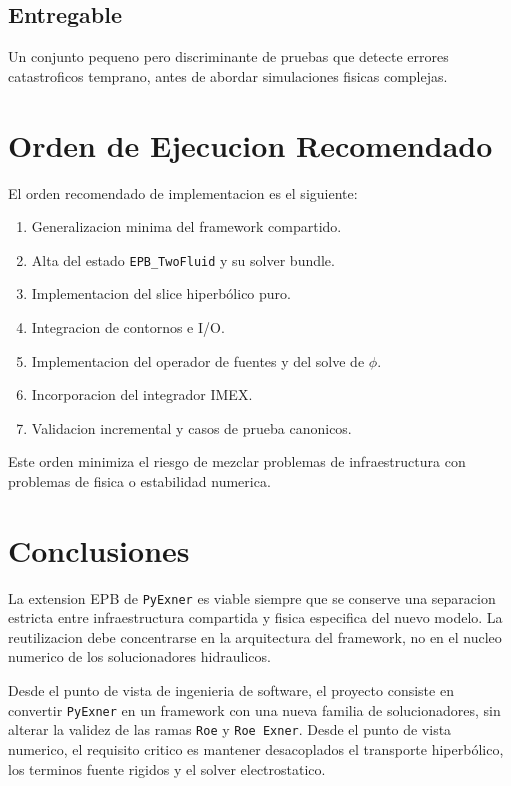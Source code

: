 \documentclass[11pt]{article}
\begin{document}
\subsection*{Entregable}

Un conjunto pequeno pero discriminante de pruebas que detecte errores catastroficos temprano, antes de abordar simulaciones fisicas complejas.

\section{Orden de Ejecucion Recomendado}

El orden recomendado de implementacion es el siguiente:

\begin{enumerate}[label=\arabic*.]
    \item Generalizacion minima del framework compartido.
    \item Alta del estado \texttt{EPB\_TwoFluid} y su solver bundle.
    \item Implementacion del slice hiperb\'olico puro.
    \item Integracion de contornos e I/O.
    \item Implementacion del operador de fuentes y del solve de $\phi$.
    \item Incorporacion del integrador IMEX.
    \item Validacion incremental y casos de prueba canonicos.
\end{enumerate}

Este orden minimiza el riesgo de mezclar problemas de infraestructura con problemas de fisica o estabilidad numerica.

\section{Conclusiones}

La extension EPB de \texttt{PyExner} es viable siempre que se conserve una separacion estricta entre infraestructura compartida y fisica especifica del nuevo modelo. La reutilizacion debe concentrarse en la arquitectura del framework, no en el nucleo numerico de los solucionadores hidraulicos.

Desde el punto de vista de ingenieria de software, el proyecto consiste en convertir \texttt{PyExner} en un framework con una nueva familia de solucionadores, sin alterar la validez de las ramas \texttt{Roe} y \texttt{Roe Exner}. Desde el punto de vista numerico, el requisito critico es mantener desacoplados el transporte hiperb\'olico, los terminos fuente rigidos y el solver electrostatico.
\end{document}
